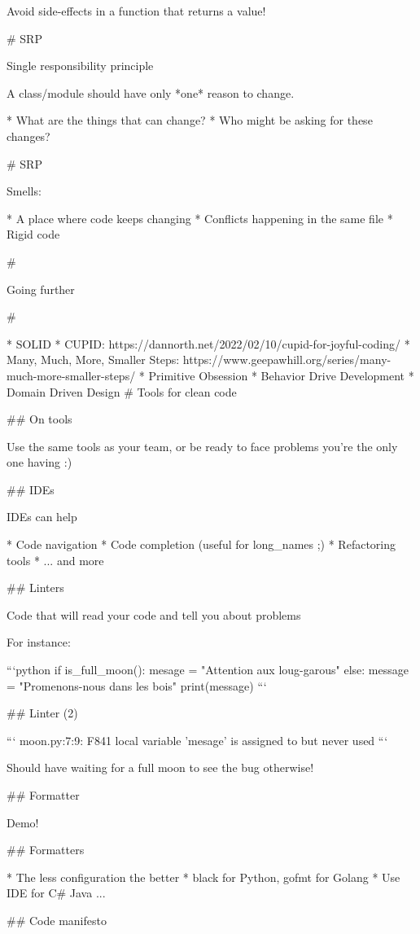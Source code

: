 \vfill

Avoid side-effects in a function that returns a value!

# SRP

Single responsibility principle

A class/module should have only *one* reason to change.

* What are the things that can change?
* Who might be asking for these changes?

# SRP

Smells:

* A place where code keeps changing
* Conflicts happening in the same file
* Rigid code

#

\huge \center Going further

#

* SOLID
* CUPID: https://dannorth.net/2022/02/10/cupid-for-joyful-coding/
* Many, Much, More, Smaller Steps: https://www.geepawhill.org/series/many-much-more-smaller-steps/
* Primitive Obsession
* Behavior Drive Development
* Domain Driven Design
# Tools for clean code

## On tools

Use the same tools as your team, or be ready to face
problems you're the only one having :)

## IDEs

IDEs can help

* Code navigation
* Code completion (useful for long_names ;)
* Refactoring tools
* ... and more

## Linters

Code that will read your code and tell you about problems

For instance:

```python
if is_full_moon():
    mesage = "Attention aux loug-garous"
else:
    message = "Promenons-nous dans les bois"
print(message)
```

## Linter (2)

```
moon.py:7:9: F841 local variable 'mesage' is assigned to but never used
```

Should have waiting for a full moon to see the bug otherwise!

## Formatter

Demo!

## Formatters

* The less configuration the better
* black for Python, gofmt for Golang
* Use IDE for C# Java
...

## Code manifesto

